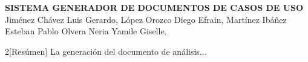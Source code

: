 \documentclass[12pt]{article}
\begin{document}
\begin{center}
	\Large \textbf{SISTEMA GENERADOR DE DOCUMENTOS DE CASOS DE USO} \\
	\small Jiménez Chávez Luis Gerardo, López Orozco Diego Efrain, Martínez Ibáñez Esteban Pablo
	Olvera Neria Yamile Giselle.
\end{center}


\begin{multicols}{2}[Resúmen]
	La generación del documento de análisis...
\end{multicols}
\end{document}
